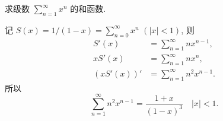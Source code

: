 \begin{exercise}
    求级数 $\sum_{n = 1}^\infty x^n$ 的和函数.
\end{exercise}

\begin{solution}
    记 $S(x) = 1 / (1 - x) = \sum_{n = 0}^\infty x^n$ $( \lvert x \rvert < 1)$, 则
    \begin{align*}
    S'(x) &= \sum_{n = 1}^\infty n x^{n - 1}, \\
    x S'(x) &= \sum_{n = 1}^\infty n x^n, \\
    (x S'(x))' &= \sum_{n = 1}^\infty n^2 x^{n - 1}.
    \end{align*}
    所以
    \[
    \sum_{n = 1}^\infty n^2 x^{n - 1} 
    = \frac{1 + x}{(1 - x)^3} \quad \lvert x \rvert < 1.
    \]
\end{solution}


